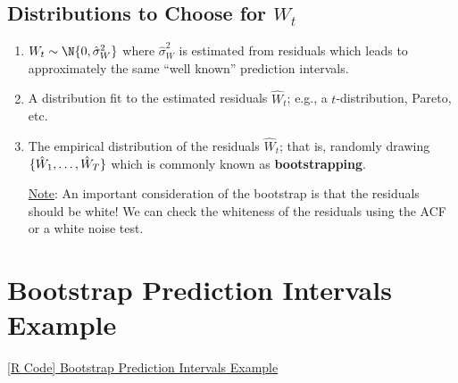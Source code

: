 \subsection*{Distributions to Choose for $ W_t $}
\begin{enumerate}[(1)]
      \item $ W_t \sim \N{0,\hat{\sigma}_W^2} $ where $ \hat{\sigma}_W^2 $ is estimated from residuals which
            leads to approximately the same ``well known'' prediction intervals.
      \item A distribution fit to the estimated residuals $ \hat{W}_t $; e.g., a $ t $-distribution,
            Pareto, etc.
      \item The empirical distribution of the residuals $ \hat{W}_t $; that is,
            randomly drawing $ \{\hat{W}_1,\ldots,\hat{W}_{T}\} $ which is commonly known
            as \textbf{bootstrapping}.

            \underline{Note}: An important consideration of the bootstrap is that the residuals should be white!
            We can check the whiteness of the residuals using the ACF or a white noise test.
\end{enumerate}
\section{Bootstrap Prediction Intervals Example}
\href{https://github.com/Hextical/university-notes/blob/master/year-3/semester-2/STAT%20443/code/6.6%20-%20Bootstrap%20Prediction%20Intervals%20Example.R}{[R Code] Bootstrap Prediction Intervals Example}
